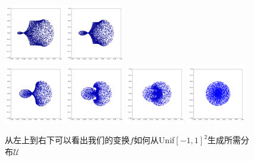 \documentclass[lang=cn,11pt]{elegantpaper}
\begin{document}
\begin{figure}[hbt]
  \includegraphics[width=0.23\textwidth]{circle_1_7}
  \includegraphics[width=0.23\textwidth]{circle_1_71}\\
  \includegraphics[width=0.23\textwidth]{circle_1_8}
  \includegraphics[width=0.23\textwidth]{circle_1_81}
  \includegraphics[width=0.23\textwidth]{circle_1_9}
  \includegraphics[width=0.23\textwidth]{circle_1_10}  
  
  \caption{从左上到右下可以看出我们的变换$f$如何从Unif$[-1,1]^2$生成所需分布$\mathcal U$}
\end{figure}
\end{document}
